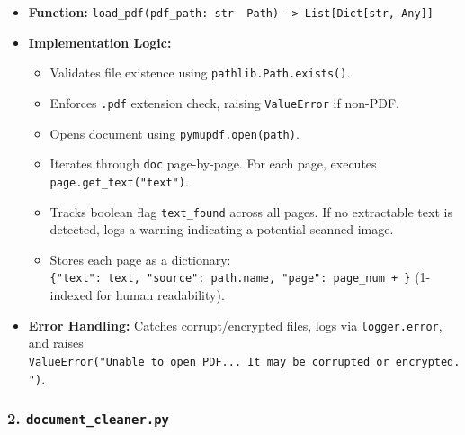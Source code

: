 \documentclass[
]{article}
\providecommand{\tightlist}{%
  \setlength{\itemsep}{0pt}\setlength{\parskip}{0pt}}
\begin{document}
\begin{itemize}
\tightlist
\item
  \textbf{Function:}
  \texttt{load\_\allowbreak pdf(\allowbreak pdf\_\allowbreak path:\ \allowbreak str\ \allowbreak \textbar{}\ \allowbreak Path)\allowbreak \ \allowbreak -\textgreater{}\allowbreak \ \allowbreak List{[}Dict{[}str,\allowbreak \ \allowbreak Any{]}{]}}
\item
  \textbf{Implementation Logic:}

  \begin{itemize}
  \tightlist
  \item
    Validates file existence using \texttt{pathlib.\allowbreak Path.\allowbreak exists(\allowbreak )\allowbreak }.
  \item
    Enforces \texttt{.\allowbreak pdf} extension check, raising \texttt{ValueError}
    if non-PDF.
  \item
    Opens document using \texttt{pymupdf.\allowbreak open(\allowbreak path)\allowbreak }.
  \item
    Iterates through \texttt{doc} page-by-page. For each page, executes
    \texttt{page.\allowbreak get\_\allowbreak text(\allowbreak "text")\allowbreak }.
  \item
    Tracks boolean flag \texttt{text\_\allowbreak found} across all pages. If no
    extractable text is detected, logs a warning indicating a potential
    scanned image.
  \item
    Stores each page as a dictionary:
    \texttt{\{"text":\ \allowbreak text,\allowbreak \ \allowbreak "source":\ \allowbreak path.\allowbreak name,\allowbreak \ \allowbreak "page":\ \allowbreak page\_\allowbreak num\ \allowbreak +\ \}}
    (1-indexed for human readability).
  \end{itemize}
\item
  \textbf{Error Handling:} Catches corrupt/encrypted files, logs via
  \texttt{logger.\allowbreak error}, and raises
  \texttt{ValueError(\allowbreak "Unable\ \allowbreak to\ \allowbreak open\ \allowbreak PDF.\allowbreak .\allowbreak .\ \allowbreak It\ \allowbreak may\ \allowbreak be\ \allowbreak corrupted\ \allowbreak or\ \allowbreak encrypted.")\allowbreak }.
\end{itemize}

\subsubsection{\texorpdfstring{2.
\texttt{document\_\allowbreak cleaner.\allowbreak py}}{2. document\_cleaner.py}}\label{document_cleaner.py}
\end{document}
